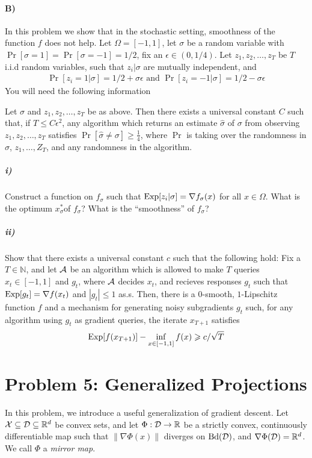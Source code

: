 \documentclass[12pt]{article}
\begin{document}
\paragraph{B)}In this problem we show that in the stochastic setting, smoothness of the function $f$ does not help. Let $\Omega = [-1,1]$, let $\sigma$ be a random variable with $\Pr[\sigma = 1] = \Pr[\sigma = -1] = 1/2$, fix an $\epsilon \in (0,1/4)$. Let $z_1,z_2,\dots,z_T$ be $T$ i.i.d random variables, such that $z_i | \sigma$ are mutually independent, and 
\begin{eqnarray}
\Pr[z_i =  1 | \sigma] = 1/2 + \sigma \epsilon \text{ and } \Pr[z_i =  -1 | \sigma] = 1/2 - \sigma \epsilon 
\end{eqnarray}
You will need the following information
\begin{lemma*} Let $\sigma$ and $z_1,z_2,\dots,z_T$ be as above. Then there exists a universal constant $C$ such that, if $T \le C \epsilon^2$, any algorithm which returns an estimate $\widehat{\sigma}$ of $\sigma$ from observing $z_1,z_2,\dots,z_T$ satisfies $\Pr[\widehat{\sigma} \ne \sigma] \ge \frac{1}{4}$, where $\Pr$ is taking over the randomness in $\sigma$, $z_1,\dots,Z_T$, and any randomness in the algorithm. 
\end{lemma*}
\subparagraph{i)} Construct a function on $f_{\sigma}$ such that $\mathrm{Exp}[z_i | \sigma] = \nabla f_{\sigma}(x)$ for all $x \in \Omega$. What is the optimum $x^*_{\sigma} $of $f_{\sigma}$? What is the ``smoothness'' of $f_{\sigma}$?
\subparagraph{ii)} Show that there exists a universal constant $c$ such that the following hold: Fix a $T \in \mathbb{N}$, and let ${\cal A}$ be an algorithm which is allowed to make $T$ queries $x_t \in [-1,1]$ and $g_t$, where ${\cal A}$ decides $x_t$, and recieves responses $g_t$ such that $\mathrm{Exp}[g_t] = \nabla f(x_t)$ and $|g_t| \le 1$ as.s. Then, there is a $0$-smooth, $1$-Lipschitz function $f$ and a mechanism for generating noisy subgradients $g_t$ such, for any algorithm using $g_t$ as gradient queries, the iterate $x_{T+1}$ satisfies
\begin{eqnarray}
\mathrm{Exp}[f(x_{T+1})] - \inf_{x \in [-1,1]} f(x)\geqslant c /\sqrt{T}
\end{eqnarray}
\section*{Problem 5: Generalized Projections}
In this problem, we introduce a useful generalization of gradient descent. Let ${\cal X} \subseteq {\cal D} \subseteq \mathbb{R}^d$ be convex sets, and let $\Phi: {\cal D} \to \mathbb{R}$ be a strictly convex, continuously differentiable map such that $\|\nabla \Phi(x)\|$ diverges on $\mathrm{Bd}({\cal D})$, and $\nabla \Phi({\cal D}) = \mathbb{R}^d$. We call $\Phi$ a \emph{mirror map}.
\end{document}
